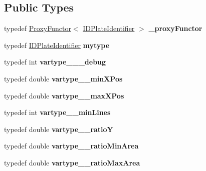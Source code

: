 \subsection*{Public Types}
\begin{DoxyCompactItemize}
\item 
\mbox{\label{classfilter_1_1_algos_1_1_i_d_plate_identifier_a8fbf5e351e89cf190bd5ac61a84f046e}} 
typedef \hyperlink{class_proxy_functor}{Proxy\+Functor}$<$ \hyperlink{classfilter_1_1_algos_1_1_i_d_plate_identifier}{I\+D\+Plate\+Identifier} $>$ {\bfseries \+\_\+proxy\+Functor}
\item 
\mbox{\label{classfilter_1_1_algos_1_1_i_d_plate_identifier_a40ddb0cd6caa012ca9725e02a84095ca}} 
typedef \hyperlink{classfilter_1_1_algos_1_1_i_d_plate_identifier}{I\+D\+Plate\+Identifier} {\bfseries mytype}
\item 
\mbox{\label{classfilter_1_1_algos_1_1_i_d_plate_identifier_af2939dcabdec9e17ae7440fef2ddf0c3}} 
typedef int {\bfseries vartype\+\_\+\+\_\+\+\_\+debug}
\item 
\mbox{\label{classfilter_1_1_algos_1_1_i_d_plate_identifier_a75d336850af77f83df6f434db5d29cdd}} 
typedef double {\bfseries vartype\+\_\+\+\_\+min\+X\+Pos}
\item 
\mbox{\label{classfilter_1_1_algos_1_1_i_d_plate_identifier_af1247907c28c5486ef40cb523c2a2f3e}} 
typedef double {\bfseries vartype\+\_\+\+\_\+max\+X\+Pos}
\item 
\mbox{\label{classfilter_1_1_algos_1_1_i_d_plate_identifier_a2365f3f805c16d8aae5a5763ef51d051}} 
typedef int {\bfseries vartype\+\_\+\+\_\+min\+Lines}
\item 
\mbox{\label{classfilter_1_1_algos_1_1_i_d_plate_identifier_ad3ed91d7b11281fb648cac0aa7edd80a}} 
typedef double {\bfseries vartype\+\_\+\+\_\+ratioY}
\item 
\mbox{\label{classfilter_1_1_algos_1_1_i_d_plate_identifier_ad68832dbcdd687a1b70369ab0e130f20}} 
typedef double {\bfseries vartype\+\_\+\+\_\+ratio\+Min\+Area}
\item 
\mbox{\label{classfilter_1_1_algos_1_1_i_d_plate_identifier_a15ba4c80cff73437d0d721060c87e10c}} 
typedef double {\bfseries vartype\+\_\+\+\_\+ratio\+Max\+Area}
\end{DoxyCompactItemize}
